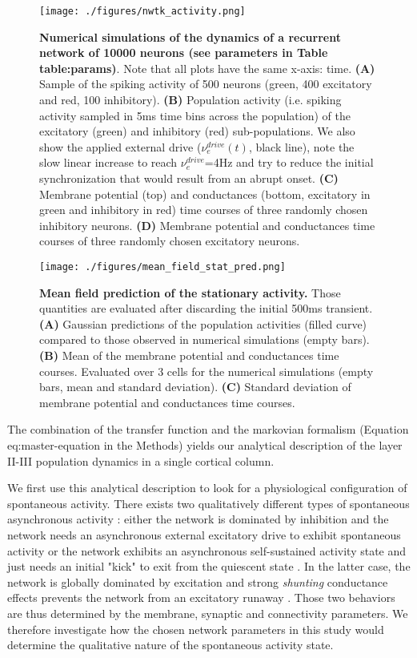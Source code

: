 \documentclass[8pt, colorlinks, a4paper]{article}
\renewcommand\ref{}
\begin{document}
\begin{figure}[tb!]
\centering
\texttt{[image: ./figures/nwtk\_activity.png]}
\caption{\label{fig:ntwk-act}\textbf{Numerical simulations of the dynamics of a recurrent network of 10000 neurons (see parameters in Table \ref{table:params})}. Note that all plots have the same x-axis: time. \textbf{(A)} Sample of the spiking activity of 500 neurons (green, 400 excitatory and red, 100 inhibitory). \textbf{(B)} Population activity (i.e. spiking activity sampled in 5ms time bins across the population) of the excitatory (green) and inhibitory (red) sub-populations. We also show the applied external drive (\(\nu_e^{drive}(t)\), black line), note the slow linear increase to reach \(\nu_e^{drive}\)=4Hz and try to reduce the initial synchronization that would result from an abrupt onset. \textbf{(C)} Membrane potential (top) and conductances (bottom, excitatory in green and inhibitory in red) time courses of three randomly chosen inhibitory neurons. \textbf{(D)} Membrane potential and conductances time courses of three randomly chosen excitatory neurons.}
\end{figure}


\begin{figure}[tb!]
\centering
\texttt{[image: ./figures/mean\_field\_stat\_pred.png]}
\caption{\label{fig:mf-stat-pred}\textbf{Mean field prediction of the stationary activity.} Those quantities are evaluated after discarding the initial 500ms transient. \textbf{(A)} Gaussian predictions of the population activities (filled curve) compared to those observed in numerical simulations (empty bars). \textbf{(B)} Mean of the membrane potential and conductances time courses. Evaluated over 3 cells for the numerical simulations (empty bars, mean and standard deviation). \textbf{(C)} Standard deviation of membrane potential and conductances time courses.}
\end{figure}

The combination of the transfer function and the markovian formalism
(Equation \ref{eq:master-equation} in the Methods) yields our analytical
description of the layer II-III population dynamics in a single
cortical column.

We first use this analytical description to look for a physiological
configuration of spontaneous activity. There exists two qualitatively
different types of spontaneous asynchronous activity
\cite{Vogels2005,Kumar2008}: either the network is dominated by
inhibition and the network needs an asynchronous external excitatory
drive to exhibit spontaneous activity \cite{Amit1997,Brunel2000} or the
network exhibits an asynchronous self-sustained activity state and
just needs an initial "kick" to exit from the quiescent state
\cite{Vogels2005,Kumar2008,ElBoustani2009}. In the latter case, the
network is globally dominated by excitation and strong \emph{shunting}
conductance effects prevents the network from an excitatory runaway
\cite{Kuhn2004,Kumar2008}. Those two behaviors are thus determined by
the membrane, synaptic and connectivity parameters. We therefore
investigate how the chosen network parameters in this study would
determine the qualitative nature of the spontaneous activity state.
\end{document}
